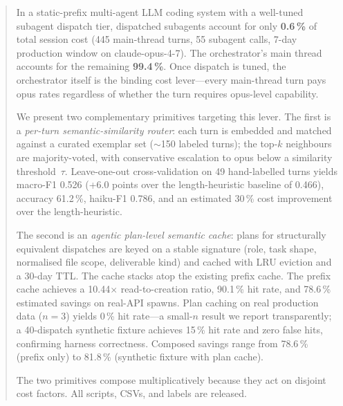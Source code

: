 \begin{abstract}
\noindent
In a static-prefix multi-agent LLM coding system with a well-tuned
subagent dispatch tier, dispatched subagents account for only
\textbf{0.6\,\%} of total session cost (445 main-thread turns,
55 subagent calls, 7-day production window on claude-opus-4-7).
The orchestrator's main thread accounts for the remaining
\textbf{99.4\,\%}. Once dispatch is tuned, the orchestrator itself
is the binding cost lever---every main-thread turn pays opus rates
regardless of whether the turn requires opus-level capability.

We present two complementary primitives targeting this lever.
The first is a \emph{per-turn semantic-similarity router}: each turn
is embedded and matched against a curated exemplar set
(\(\sim\)150 labeled turns); the top-\(k\) neighbours are
majority-voted, with conservative escalation to opus below a
similarity threshold~\(\tau\). Leave-one-out cross-validation on
49 hand-labelled turns yields macro-F1 0.526 (+6.0 points over the
length-heuristic baseline of 0.466), accuracy 61.2\,\%, haiku-F1 0.786,
and an estimated 30\,\% cost improvement over the length-heuristic.

The second is an \emph{agentic plan-level semantic cache}: plans for
structurally equivalent dispatches are keyed on a stable signature
(role, task shape, normalised file scope, deliverable kind) and
cached with LRU eviction and a 30-day TTL. The cache stacks atop
the existing prefix cache. The prefix cache achieves a 10.44\(\times\)
read-to-creation ratio, 90.1\,\% hit rate, and 78.6\,\% estimated
savings on real-API spawns. Plan caching on real production data
(\(n=3\)) yields 0\,\% hit rate---a small-\(n\) result we report
transparently; a 40-dispatch synthetic fixture achieves 15\,\% hit
rate and zero false hits, confirming harness correctness.
Composed savings range from 78.6\,\% (prefix only) to 81.8\,\%
(synthetic fixture with plan cache).

The two primitives compose multiplicatively because they act on
disjoint cost factors. All scripts, CSVs, and labels are released.
\end{abstract}
